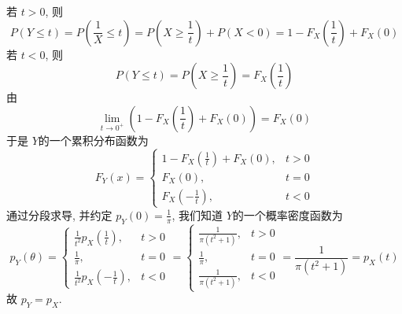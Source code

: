 \documentclass[../main.tex]{subfiles}
\begin{document}
\begin{solution}
    若 \(  t> 0  \), 则  \[
P\left( Y\le t \right)= P\left( \frac{1 }{X }  \le t\right)= P\left( X\ge \frac{1 }{t } \right)+ P\left( X< 0 \right) = 1- F_{X}\left( \frac{1 }{t }  \right)+ F_{X}\left( 0 \right)   
\]若 \(  t< 0  \), 则 \[
P\left( Y\le t \right)=  P\left( X\ge  \frac{1 }{t }  \right)  = F_{X}\left( \frac{1 }{t }  \right) 
\] 由 \[
\lim_{t \to 0^{+ }}\left( 1-F_{X}\left( \frac{1 }{t }  \right)+ F_{X}\left( 0 \right)   \right)= F_{X}\left( 0 \right)  
\]于是 \(  Y  \)的一个累积分布函数为 \[
F_{Y}\left( x \right)= \begin{cases} 1-F_{X}\left( \frac{1 }{t }  \right)+ F_{X}\left( 0 \right),& t> 0\\ 
 F_{X}\left( 0 \right),& t= 0\\ 
  F_{X}\left( -\frac{1 }{t }  \right),&t< 0     \end{cases}  
\] 通过分段求导, 并约定 \(  p_{Y}\left( 0 \right)= \frac{1 }{ \pi  }    \),  我们知道 \(  Y  \)的一个概率密度函数为 \[
p_{Y}\left(  \theta  \right)= \begin{cases} \frac{1 }{t^{2} }  p_{X}\left( \frac{1 }{t }  \right) ,& t> 0\\ 
 \frac{1 }{ \pi  },& t= 0 \\ 
 \frac{1 }{t^{2} }p_{X}\left( -\frac{1 }{t }  \right),& t< 0   \end{cases} = \begin{cases} \frac{1 }{ \pi \left( t^{2}+ 1 \right)  } ,& t> 0\\ 
   \frac{1 }{ \pi  },& t= 0\\ 
    \frac{1 }{ \pi \left( t^{2}+ 1 \right)  },& t< 0   \end{cases}=  \frac{1 }{ \pi \left( t^{2}+ 1 \right)  }=  p_{X}   \left( t \right) 
\] 故 \(  p_{Y}  = p_{X}\). 
\end{solution}
\end{document}
